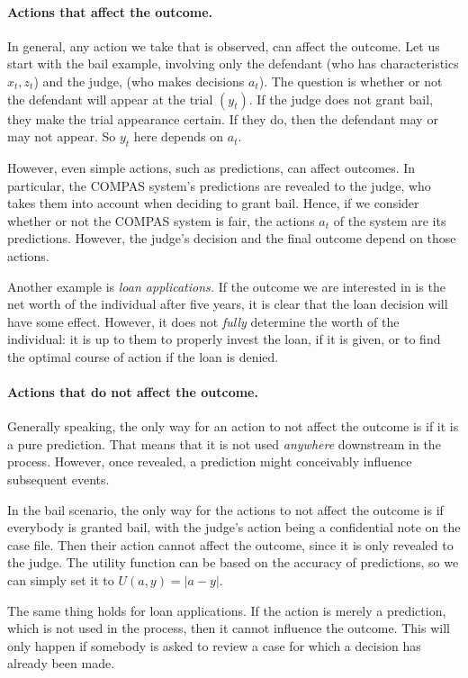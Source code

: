 \begin{frame}
\paragraph{Actions that affect the outcome.}
  In general, any action we take that is observed, can affect the outcome. 
  Let us start with the bail example, involving only the defendant (who has characteristics $x_t, z_t$) and the judge, (who makes decisions $a_t$). The question is whether or not the defendant will appear at the trial $(y_t)$.
  If the judge does not grant bail, they make the trial appearance certain. If they do, then the defendant may or may not appear. So $y_t$ here depends on $a_t$.
  
  However, even simple actions, such as predictions, can
  affect outcomes. In particular, the COMPAS system's predictions are
  revealed to the judge, who takes them into account when deciding to
  grant bail. Hence, if we consider whether or not the COMPAS system
  is fair, the actions $a_t$ of the system are its
  predictions. However, the judge's decision and the final outcome
  depend on those actions.

  Another example is \emph{loan applications.} If the outcome we are
  interested in is the net worth of the individual after five years,
  it is clear that the loan decision will have some effect. However,
  it does not \emph{fully} determine the worth of the individual:
  it is up to them to properly invest the loan, if it is given, or to
  find the optimal course of action if the loan is denied.

  \paragraph{Actions that do not affect the outcome.} Generally
  speaking, the only way for an action to not affect the outcome is if
  it is a pure prediction. That means that it is not used
  \emph{anywhere} downstream in the process. However, once revealed, a
  prediction might conceivably influence subsequent events.

  In the bail scenario, the only way for the actions to not affect
  the outcome is if everybody is granted bail, with the judge's
  action being a confidential note on the case file. Then their
  action cannot affect the outcome, since it is only revealed to the
  judge. The utility function can be based on the accuracy of
  predictions, so we can simply set it to $U(a,y) = |a - y|$.
  
  The same thing holds for loan applications. If the action is
  merely a prediction, which is not used in the process, then it
  cannot influence the outcome. This will only happen if somebody is
  asked to review a case for which a decision has already been made. 
\end{frame}

